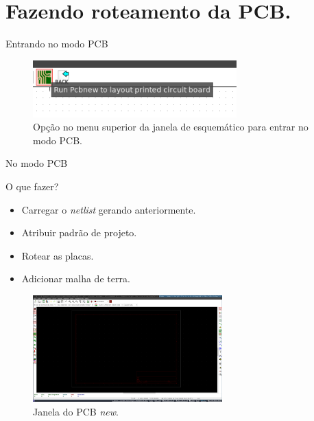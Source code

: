 \documentclass{beamer}
\begin{document}
\section{Fazendo roteamento da PCB.}
\begin{frame}{Entrando no modo PCB}
	\begin{figure}
		\centering
		\includegraphics[width=0.7\textwidth]{Imagens/24_rodando_pcbnew.png}
		\caption{Opção no menu superior da janela de esquemático para entrar no modo PCB.}
	\end{figure}
\end{frame}

\begin{frame}{No modo PCB}
	\begin{block}{O que fazer?}
		\begin{itemize}
			\item Carregar o \textit{netlist} gerando anteriormente.
			\item Atribuir padrão de projeto.
			\item Rotear as placas.
			\item Adicionar malha de terra.
		\end{itemize}
	\end{block}
		\pause
	\begin{figure}
		\centering
		\includegraphics[width=0.65\textwidth]{Imagens/25_janela_pcbnew.png}
		\caption{Janela do PCB \textit{new}.}
	\end{figure}
\end{frame}
\end{document}
